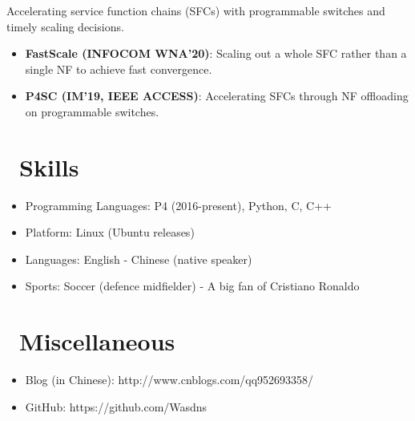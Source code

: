 \documentclass{resume}
\begin{document}
Accelerating service function chains (SFCs) with programmable switches and timely scaling decisions.
\begin{itemize}
  \item \textbf{FastScale (INFOCOM WNA'20)}: Scaling out a whole SFC rather than a single NF to achieve fast convergence. 
  \item \textbf{P4SC (IM'19, IEEE ACCESS)}: Accelerating SFCs through NF offloading on programmable switches.
\end{itemize}


\section{\faCogs\ Skills}
\begin{itemize}[parsep=0.5ex]
  \item Programming Languages: P4 (2016-present), Python, C, C++
  \item Platform: Linux (Ubuntu releases)
  \item Languages: English - Chinese (native speaker)
  \item Sports: Soccer (defence midfielder) - A big fan of Cristiano Ronaldo
\end{itemize}


\section{\faInfo\ Miscellaneous}
\begin{itemize}[parsep=0.5ex]
  \item Blog (in Chinese): http://www.cnblogs.com/qq952693358/
  \item GitHub: https://github.com/Wasdns
\end{itemize}

%
%
\end{document}
